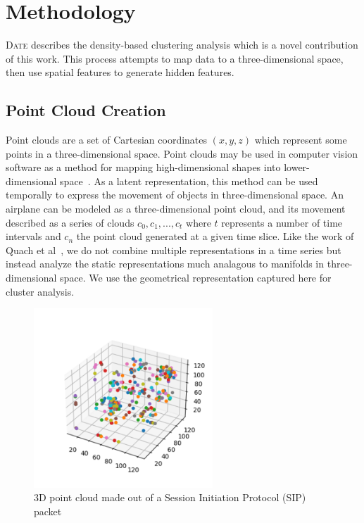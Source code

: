 \section{Methodology}

\textsc{Date} describes the density-based clustering analysis which is a novel contribution of this work. This process attempts to map data to a three-dimensional space, then use spatial features to generate hidden features.

\subsection{Point Cloud Creation}
Point clouds are a set of Cartesian coordinates $(x, y, z)$ which represent some points in a three-dimensional space. Point clouds may be used in computer vision software as a method for mapping high-dimensional shapes into lower-dimensional space~\cite{Wang_2019_ICCV}. As a latent representation, this method can be used temporally to express the movement of objects in three-dimensional space. An airplane can be modeled as a three-dimensional point cloud, and its movement described as a series of clouds ${c_0, c_1,...,c_t}$ where $t$ represents a number of time intervals and $c_n$ the point cloud generated at a given time slice. Like the work of Quach et al~\cite{Quach2020compression}, we do not combine multiple representations in a time series but instead analyze the static representations much analagous to manifolds in three-dimensional space. We use the geometrical representation captured here for cluster analysis.

\begin{figure} [ht!]
\centering
\includegraphics[width=0.6\textwidth]{chapters/6/img/sipcloud.png}
\caption{3D point cloud made out of a Session Initiation Protocol (SIP) packet}
\label{fig:cloud}
\end{figure}

